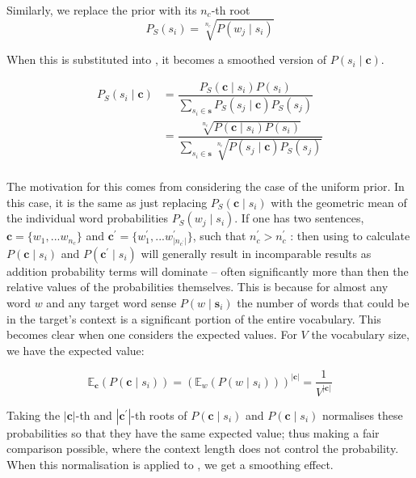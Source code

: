 \documentclass{sig-alternate}
\renewcommand{\c}{\mathbf{c}}
\newcommand{\s}{\mathbf{s}}
\begin{document}
Similarly, we replace the prior with its $n_c$-th root
\begin{equation} \label{eq:priorsmoothed}
P_S(s_{i})= \sqrt[n_c]{P(w_{j} \mid s_{i})}
\end{equation}


When this is substituted into , it becomes a smoothed version of $P(s_{i} \mid \c)$.


\begin{equation} \label{eq:generalwsdsmoothed}
\begin{aligned}
P_S(s_{i}\mid\c) %
&=\dfrac{P_{S}(\c\mid s_{i})P(s_{i})}
{\sum_{s_{i}\in\s} P_{S}(s_{j}\mid\c) P_S(s_{j})} \\
%
&=\dfrac{\sqrt[n_c]{P(\c\mid s_{i})P(s_{i})}}
{\sum_{s_{i}\in\s} \sqrt[n_c]{P(s_{j}\mid\c)P_S(s_{j})}} \\
%
\end{aligned}
\end{equation}

The motivation for this comes from considering the case of the uniform prior.
In this case, it is the same as just replacing $P_S(\c \mid s_{i})$ with the geometric mean of the individual word probabilities $P_S(w_j \mid s_{i})$.
If one has two sentences, $\c=\{w_1,...w_{n_c}\}$ and $\c^\prime=\{w_1^\prime,...w^\prime_{|n_{c^\prime}|}\}$, such that $n_c^\prime > n_c^\prime$ :
then using  to calculate $P(\c \mid s_{i})$ and $P(\c^\prime \mid s_{i})$ will generally result in incomparable results as addition probability terms will dominate -- often significantly more than then the relative values of the probabilities themselves. This is because for almost any word $w$ and any target word sense $P(w \mid \s_i)$ the number of words that could be in the target's context is a significant portion of the entire vocabulary.
This becomes clear when one considers the expected values. For $V$ the vocabulary size, we have the expected value:

\begin{equation} \label{eq:expectcontexprob}
\mathbb{E}_\c(P(\c \mid s_{i}))
=(\mathbb{E}_w(P(w \mid s_i)))^{|\c|}
= \frac{1}{V^{|\c|}}
\end{equation}

Taking the $|\c|$-th and $|\c^\prime|$-th roots of $P(\c \mid s_{i})$ and $P(\c \mid s_{i})$ normalises these probabilities so that they have the same expected value; thus making a fair comparison possible, where the context length does not control the probability.
When this normalisation is applied to , we get a smoothing effect.
\end{document}
